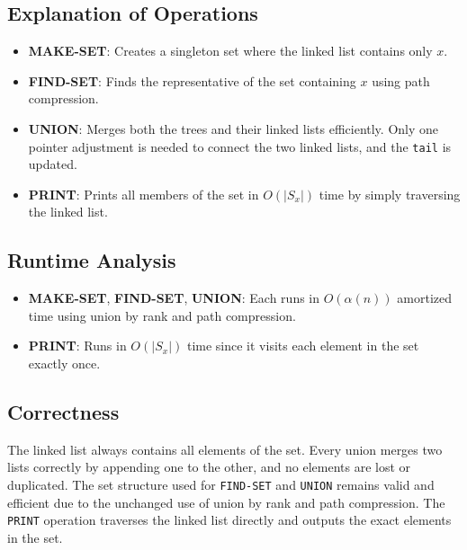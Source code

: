 \documentclass[12pt]{article}
\begin{document}
\subsection*{Explanation of Operations}

\begin{itemize}
    \item \textbf{MAKE-SET}: Creates a singleton set where the linked list contains only \( x \).
    \item \textbf{FIND-SET}: Finds the representative of the set containing \( x \) using path compression.
    \item \textbf{UNION}: Merges both the trees and their linked lists efficiently. Only one pointer adjustment is needed to connect the two linked lists, and the \texttt{tail} is updated.
    \item \textbf{PRINT}: Prints all members of the set in \( O(|S_x|) \) time by simply traversing the linked list.
\end{itemize}

\subsection*{Runtime Analysis}

\begin{itemize}
    \item \textbf{MAKE-SET}, \textbf{FIND-SET}, \textbf{UNION}: Each runs in \( O(\alpha(n)) \) amortized time using union by rank and path compression.
    \item \textbf{PRINT}: Runs in \( O(|S_x|) \) time since it visits each element in the set exactly once.
\end{itemize}

\subsection*{Correctness}

The linked list always contains all elements of the set. Every union merges two lists correctly by appending one to the other, and no elements are lost or duplicated. The set structure used for \texttt{FIND-SET} and \texttt{UNION} remains valid and efficient due to the unchanged use of union by rank and path compression. The \texttt{PRINT} operation traverses the linked list directly and outputs the exact elements in the set.
\end{document}
